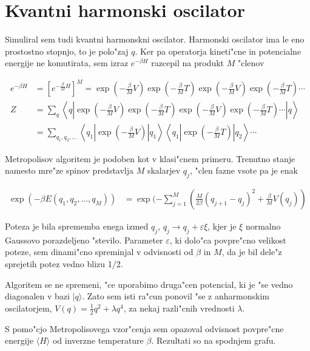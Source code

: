 \documentclass[a4paper,10pt]{article}
\begin{document}
\section{Kvantni harmonski oscilator}

Simuliral sem tudi kvantni harmonskni oscilator. 
Harmonski oscilator ima le eno prostostno stopnjo, to je polo"zaj $q$. 
Ker pa operatorja kineti"cne in potencialne energije ne komutirata, sem izraz $e^{-\beta H}$ razcepil na produkt $M$ "clenov

\begin{align}
 e^{-\beta H} &= \left[e^{-\frac{\beta}{M}H}\right]^M = \exp\left(-{\frac{\beta}{M}V}\right) \exp\left(-{\frac{\beta}{M}T}\right) \exp\left(-{\frac{\beta}{M}V}\right) \exp\left(-{\frac{\beta}{M}T}\right) \cdots \\
 Z &= \sum_{q} \left\langle q \left|\exp\left(-{\frac{\beta}{M}V}\right) \exp\left(-{\frac{\beta}{M}T}\right) \exp\left(-{\frac{\beta}{M}V}\right) \exp\left(-{\frac{\beta}{M}T}\right) \cdots \right| q \right\rangle \\
 &= \sum_{q_1, q_2, \ldots} \left\langle q_1 \left|\exp\left(-{\frac{\beta}{M}V}\right) \right|q_1\right\rangle \left\langle q_1 \left| \exp\left(-{\frac{\beta}{M}T}\right) \right|q_2\right\rangle \cdots
\end{align}


Metropolisov algoritem je podoben kot v klasi"cnem primeru.
Trenutno stanje namesto mre"ze spinov predstavlja $M$ skalarjev $q_j$, "clen fazne vsote pa je enak

\begin{align}
 \exp\left(-\beta E(q_1, q_2, \ldots, q_M)\right) &= \exp(-\sum_{j=1}^M \left( \frac{M}{2\beta} (q_{j+1} - q_j)^2 + \frac{\beta}{M} V(q_j) \right)
\end{align}

Poteza je bila sprememba enega izmed $q_j$, $q_j \to q_j + \varepsilon \xi$, kjer je $\xi$ normalno Gaussovo porazdeljeno "stevilo. 
Parameter $\varepsilon$, ki dolo"ca povpre"cno velikost poteze, sem dinami"cno spreminjal v odvisnosti od $\beta$ in $M$, da je bil dele"z sprejetih potez vedno blizu 1/2. 

Algoritem se ne spremeni, "ce uporabimo druga"cen potencial, ki je "se vedno diagonalen v bazi $|q\rangle$. 
Zato sem isti ra"cun ponovil "se z anharmonskim oscilatorjem, $V(q) = \frac{1}{2}q^2 + \lambda q^4$, za nekaj razli"cnih vrednosti $\lambda$. 

S pomo"cjo Metropolisovega vzor"cenja sem opazoval odvisnost povpre"cne energije $\langle H \rangle$ od inverzne temperature $\beta$. 
Rezultati so na spodnjem grafu. 
\end{document}
